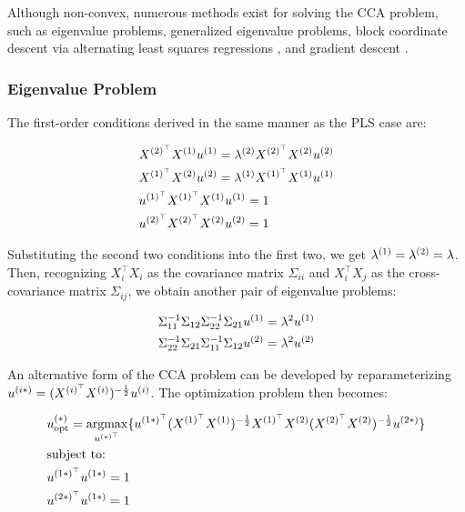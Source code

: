 Although non-convex, numerous methods exist for solving the CCA problem, such as eigenvalue problems, generalized eigenvalue problems, block coordinate descent via alternating least squares regressions \cite{golub1995canonical,sun2008least} , and gradient descent \cite{via2007learning}.

\subsubsection{Eigenvalue Problem}

The first-order conditions derived in the same manner as the PLS case are:

\begin{align}\label{CCA:FOCs}
     & X^{(2)^{\top}}X^{(1)}u^{(1)}=\lambda^{(2)} X^{(2)^{\top}}X^{(2)}u^{(2)} \\
     & X^{(1)^{\top}}X^{(2)}u^{(2)}=\lambda^{(1)} X^{(1)^{\top}}X^{(1)}u^{(1)} \\
     & u^{(1)^{\top}}X^{(1)^{\top}}X^{(1)}u^{(1)}=1 \\
     & u^{(2)^{\top}}X^{(2)^{\top}}X^{(2)}u^{(2)}=1
\end{align}

Substituting the second two conditions into the first two, we get \(\lambda^{(1)}=\lambda^{(2)}=\lambda\). Then, recognizing \(X_i^{\top}X_i\) as the covariance matrix \(\Sigma_{ii}\) and \(X_i^{\top}X_j\) as the cross-covariance matrix \(\Sigma_{ij}\), we obtain another pair of eigenvalue problems:

\begin{align}
     & \Sigma_{11}^{-1}\Sigma_{12}\Sigma_{22}^{-1}\Sigma_{21}u^{(1)}=\lambda^2u^{(1)} \notag \\
     & \Sigma_{22}^{-1}\Sigma_{21}\Sigma_{11}^{-1}\Sigma_{12}u^{(2)}=\lambda^2u^{(2)} \notag
\end{align}

An alternative form of the CCA problem can be developed by reparameterizing \(u^{(i*)}=(X^{(i)^{\top}}X^{(i)})^{-\frac{1}{2}}u^{(i)}\). The optimization problem then becomes:

\begin{align}
     & u^{(*)}_{\text{opt}}=\underset{u^{(*)^{\top}}}{\mathrm{argmax}}\{ u^{(1*)^{\top}}(X^{(1)^{\top}}X^{(1)})^{-\frac{1}{2}}X^{(1)^{\top}}X^{(2)}(X^{(2)^{\top}}X^{(2)})^{-\frac{1}{2}}u^{(2*)} \} \\
     & \text{subject to:} \notag \\
     & u^{(1*)^{\top}}u^{(1*)}=1 \notag \\
     & u^{(2*)^{\top}}u^{(1*)}=1 \notag
\end{align}

